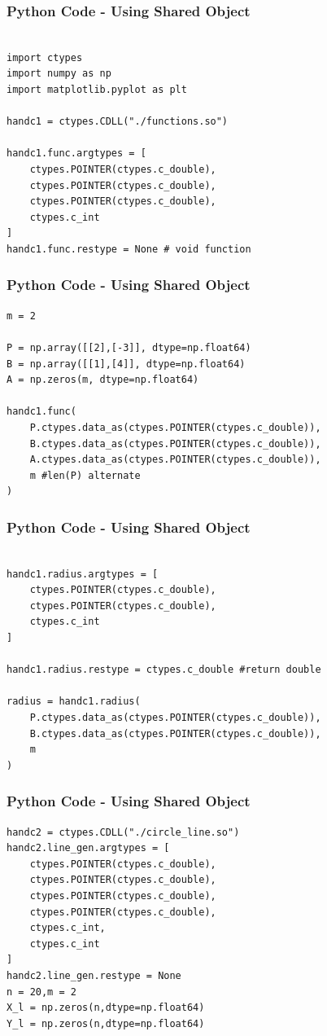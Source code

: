 \documentclass{beamer}
\begin{document}
\begin{frame}[fragile]
    \frametitle{Python Code - Using Shared Object}
    \begin{lstlisting}

import ctypes
import numpy as np
import matplotlib.pyplot as plt

handc1 = ctypes.CDLL("./functions.so")

handc1.func.argtypes = [
    ctypes.POINTER(ctypes.c_double),
    ctypes.POINTER(ctypes.c_double),
    ctypes.POINTER(ctypes.c_double),
    ctypes.c_int
]
handc1.func.restype = None # void function
\end{lstlisting}
\end{frame}

\begin{frame}[fragile]
    \frametitle{Python Code - Using Shared Object}
    \begin{lstlisting}
m = 2

P = np.array([[2],[-3]], dtype=np.float64)
B = np.array([[1],[4]], dtype=np.float64)
A = np.zeros(m, dtype=np.float64)

handc1.func(
    P.ctypes.data_as(ctypes.POINTER(ctypes.c_double)),
    B.ctypes.data_as(ctypes.POINTER(ctypes.c_double)),
    A.ctypes.data_as(ctypes.POINTER(ctypes.c_double)),
    m #len(P) alternate
)
\end{lstlisting}
\end{frame}

\begin{frame}[fragile]
    \frametitle{Python Code - Using Shared Object}
    \begin{lstlisting}

handc1.radius.argtypes = [
    ctypes.POINTER(ctypes.c_double),
    ctypes.POINTER(ctypes.c_double),
    ctypes.c_int
]

handc1.radius.restype = ctypes.c_double #return double

radius = handc1.radius(
    P.ctypes.data_as(ctypes.POINTER(ctypes.c_double)),
    B.ctypes.data_as(ctypes.POINTER(ctypes.c_double)),
    m
)
\end{lstlisting}
\end{frame}

\begin{frame}[fragile]
    \frametitle{Python Code - Using Shared Object}
    \begin{lstlisting}
handc2 = ctypes.CDLL("./circle_line.so")
handc2.line_gen.argtypes = [
    ctypes.POINTER(ctypes.c_double),
    ctypes.POINTER(ctypes.c_double),
    ctypes.POINTER(ctypes.c_double),
    ctypes.POINTER(ctypes.c_double),
    ctypes.c_int,
    ctypes.c_int
]
handc2.line_gen.restype = None
n = 20,m = 2
X_l = np.zeros(n,dtype=np.float64)
Y_l = np.zeros(n,dtype=np.float64)
\end{lstlisting}
\end{frame}
\end{document}
